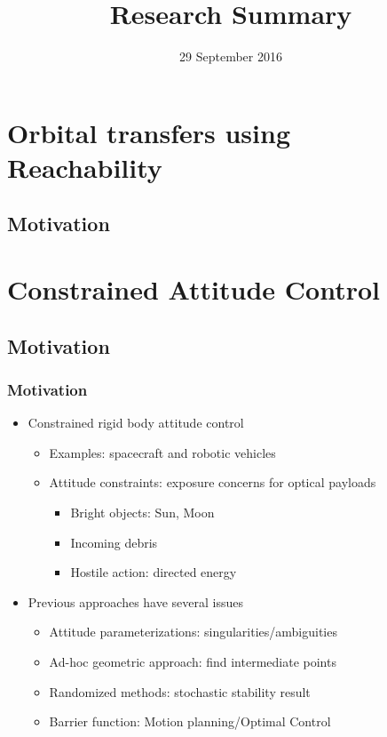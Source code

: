 \documentclass[11pt,professionalfonts]{beamer}
\title[Research Summary]{\large\bf  Research Summary}
\author{\vspace*{-0.3cm}}
\date{29 September 2016}
\institute{
	\footnotesize
	{\normalsize\bf{Shankar Kulumani}}\\
	Ph.D. student\\
	\vspace*{0.2cm}
  	\bf{Department of Mechanical \& Aerospace Engineering}\\ \vspace*{0.5cm}
 	\begin{figure} %
       	\texttt{[image: gw\_txh\_2cs\_pos]}
  	\end{figure}
}
\begin{document}

\setcounter{framenumber}{-1}
\begin{frame} %
  \titlepage
\end{frame}   %

\section{Orbital transfers using Reachability}
\subsection{Motivation}




\section{Constrained Attitude Control}
\subsection{Motivation}

\begin{frame} %
	\frametitle{Motivation}
	\begin{itemize}
		\item Constrained rigid body attitude control
		\begin{itemize}
			\item Examples: spacecraft and robotic vehicles
			\item Attitude constraints: exposure concerns for optical payloads
			\begin{itemize}
				\item Bright objects: Sun, Moon
				\item Incoming debris
				\item Hostile action: directed energy
			\end{itemize}
		\end{itemize}
	\pause
	\item Previous approaches have several issues
	\begin{itemize}
		\item Attitude parameterizations: singularities/ambiguities
		\item Ad-hoc geometric approach: find intermediate points
		\item Randomized methods: stochastic stability result
		\item Barrier function: Motion planning/Optimal Control
	\end{itemize}
\end{itemize}
\end{frame} %
\end{document}

